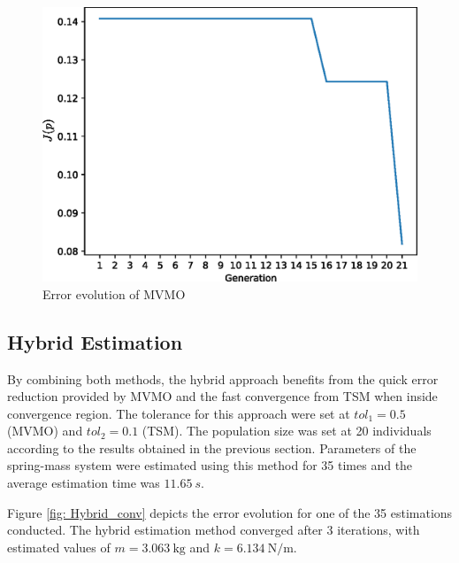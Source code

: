 \begin{figure}[h]
	\caption{Error evolution of MVMO}
	\begin{center}
		\includegraphics[scale=0.6]{Images/MVMO_conv.eps}
	\end{center}
	\label{fig: MVMO_conv}
\end{figure}

\subsection{Hybrid Estimation}

By combining both methods, the hybrid approach benefits from the quick error reduction provided by MVMO and the fast convergence from TSM when inside convergence region. The tolerance for this approach were set at $tol_{1} = 0.5$ (MVMO) and $tol_{2} = 0.1$ (TSM). The population size was set at 20 individuals according to the results obtained in the previous section. Parameters of the spring-mass system were estimated using this method for 35 times and the average estimation time was $11.65\ s$.

Figure \ref{fig: Hybrid_conv} depicts the error evolution for one of the 35 estimations conducted. The hybrid estimation method converged after 3 iterations, with estimated values of $m=3.063\ \text{kg}$ and $k=6.134\ \text{N/m}$.

